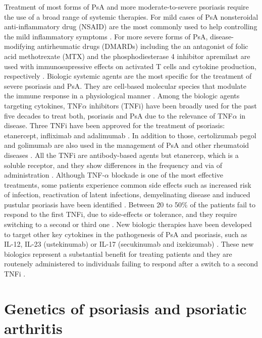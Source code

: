 Treatment of most forms of PsA and more moderate-to-severe psoriasis require the use of a broad range of systemic therapies. For mild cases of PsA nonsteroidal anti-inflammatory drug (NSAID) are the most commonly used to help controlling the mild inflammatory symptoms \parencite{Coates2016}. For more severe forms of PsA, disease-modifying antirheumatic drugs (DMARDs) including the an antagonist of folic acid methotrexate (MTX) and the phosphodiesterase 4 inhibitor apremilast are used with immunosupressive effects on activated T cells and cytokine production, respectively \parencite{Schmitt2014, Gossec2016, Keating2017,Polachek2017}. Biologic systemic agents are the most specific for the treatment of severe psoriasis and PsA. They are cell-based molecular species that modulate the immune response in a physiological manner \parencite{Perera2012}. Among the biologic agents targeting cytokines, TNF$\alpha$ inhibitors (TNFi) have been broadly used for the past five decades to treat both, psoriasis and PsA due to the relevance of TNF$\alpha$ in disease. Three TNFi have been approved for the treatment of psoriasis: etanercept, infliximab and adalimumab \parencite{Ahil2016}. In addition to those, certolizumab pegol and golimumab are also used in the management of PsA and other rheumatoid diseases \parencite{Coates2016b}. All the TNFi are antibody-based agents but etanercep, which is a soluble receptor, and they show differences in the frequency and via of administration \parencite{Mease2000}. Although TNF-$\alpha$ blockade is one of the most effective treatments, some patients experience common side effects such as increased risk of infection, reactivation of latent infections, demyelinating disease and induced pustular psoriasis have been identified \parencite{Nickoloff2004}. Between 20 to 50\% of the patients fail to respond to the first TNFi, due to side-effects or tolerance, and they require switching to a second or third one \parencite{Abramson2016}. New biologic therapies have been developed to target other key cytokines in the pathogenesis of PsA and psoriasis, such as IL-12, IL-23 (ustekinumab) or  IL-17 (secukinumab and ixekizumab) \parencite{Mahil2016}. These new biologics represent a substantial benefit for treating patients and they are routenely administered to individuals failing to respond after a switch to a second TNFi \parencite{Coates2016b}.
 

\section{Genetics of psoriasis and psoriatic arthritis}

